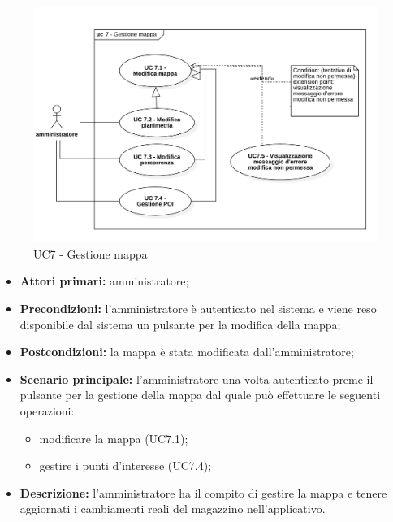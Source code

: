 \begin{figure}[H]
	\centering
	\includegraphics[scale=0.52]{res/images/uc7.png}
	\caption{UC7 - Gestione mappa}
\end{figure}

\begin{itemize}
	\item 	\textbf{Attori primari:} amministratore;
	\item 	\textbf{Precondizioni:} l'amministratore è autenticato nel sistema e viene reso disponibile dal sistema un pulsante per la modifica della mappa;
	\item 	\textbf{Postcondizioni:} la mappa è stata modificata dall'amministratore;
	\item 	\textbf{Scenario principale:} l'amministratore una volta autenticato preme il pulsante per la gestione della mappa dal quale può effettuare le seguenti operazioni:
	\begin{itemize}
		\item modificare la mappa (UC7.1);
		\item gestire i punti d'interesse (UC7.4);
	\end{itemize}
	\item 	\textbf{Descrizione:} l'amministratore ha il compito di gestire la mappa e tenere aggiornati i cambiamenti reali del magazzino nell'applicativo.
\end{itemize}


